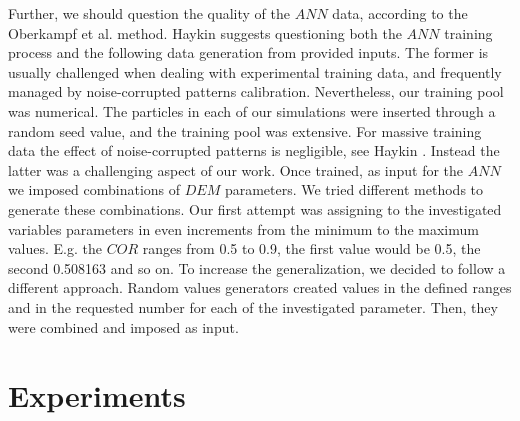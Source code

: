 \begin{appendix}
Further, we should question the quality of the $ANN$ data, according to the 
Oberkampf et al. \cite{RefWorks:160} method. Haykin \cite{RefWorks:158} 
suggests questioning both the $ANN$ training process and the following data
generation from provided inputs.
The former is usually challenged when dealing with experimental training data, and frequently 
managed by noise-corrupted patterns calibration. Nevertheless, our training pool
was numerical.
The particles in each of our simulations were inserted through a random
seed value, and the training pool was extensive.
For massive training data the effect of noise-corrupted patterns is negligible, see Haykin \cite{RefWorks:158}. 
Instead the latter was a challenging aspect of our work. Once trained, as input for the $ANN$ we imposed 
combinations of $DEM$ parameters. 
We tried different methods to generate these combinations. 
Our first attempt was assigning to the investigated variables parameters in even increments 
from the minimum to the maximum values. 
E.g. the $COR$ ranges from 0.5 to 0.9, the first value would be 0.5, the second 0.508163 and so on. 
To increase the generalization, we decided to follow a different approach. 
Random values generators created values in the defined ranges and in the requested 
number for each of the investigated parameter. Then, they were combined and imposed as input.\\



\section{Experiments}
\label{sec:appexperiments}


\end{appendix}
